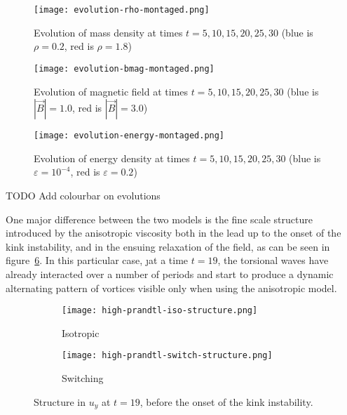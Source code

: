 \begin{figure}[t]
  \centering
  \texttt{[image: evolution-rho-montaged.png]}
  \caption{Evolution of mass density at times $t=5, 10, 15, 20, 25, 30$ (blue is $\rho = 0.2$, red is $\rho=1.8$)}
  \label{fig:mass_density_evolution}
\end{figure}

\begin{figure}[t]
  \centering
  \texttt{[image: evolution-bmag-montaged.png]}
  \caption{Evolution of magnetic field at times $t=5, 10, 15, 20, 25, 30$ (blue is $|\vec{B}| = 1.0$, red is $|\vec{B}|=3.0$)}
  \label{fig:magnetic_field_evolution}
\end{figure}

\begin{figure}[t]
  \centering
  \texttt{[image: evolution-energy-montaged.png]}
  \caption{Evolution of energy density at times $t=5, 10, 15, 20, 25, 30$ (blue is $\varepsilon = 10^{-4}$, red is $\varepsilon = 0.2$)}
  \label{fig:energy_evolution}
\end{figure}

TODO Add colourbar on evolutions

One major difference between the two models is the fine scale structure introduced by the anisotropic viscosity both in the lead up to the onset of the kink instability, and in the ensuing relaxation of the field, as can be seen in figure~\ref{fig:fine_structure}. In this particular case, \j{at} a time $t=19$, the torsional waves have already interacted over a number of periods and start to produce a dynamic alternating pattern of vortices visible only when using the anisotropic model.

\begin{figure}[t]
  \centering
  \begin{subfigure}{.45\textwidth}
  \centering
  \texttt{[image: high-prandtl-iso-structure.png]}
  \caption{Isotropic}
  \label{fig:isotropic_fine_structure}
  \end{subfigure}
  \begin{subfigure}{.45\textwidth}
  \centering
  \texttt{[image: high-prandtl-switch-structure.png]}
  \caption{Switching}
  \label{fig:switching_fine_structure}
  \end{subfigure}
  
  \caption{Structure in $u_y$ at $t=19$, before the onset of the kink instability.}
  \label{fig:fine_structure}
\end{figure}

